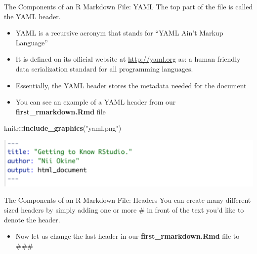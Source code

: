\documentclass[
  ignorenonframetext,
]{beamer}
\newenvironment{Shaded}{\begin{snugshade}}{\end{snugshade}}
\newcommand{\FunctionTok}[1]{\textcolor[rgb]{0.13,0.29,0.53}{\textbf{#1}}}
\newcommand{\NormalTok}[1]{#1}
\newcommand{\SpecialCharTok}[1]{\textcolor[rgb]{0.81,0.36,0.00}{\textbf{#1}}}
\newcommand{\StringTok}[1]{\textcolor[rgb]{0.31,0.60,0.02}{#1}}
\providecommand{\tightlist}{%
  \setlength{\itemsep}{0pt}\setlength{\parskip}{0pt}}
\begin{document}
\begin{frame}[fragile]{The Components of an R Markdown File: YAML}
\protect\hypertarget{the-components-of-an-r-markdown-file-yaml}{}
The top part of the file is called the YAML header.

\begin{itemize}
\item
  YAML is a recursive acronym that stands for ``YAML Ain't Markup
  Language''
\item
  It is defined on its official website at \url{http://yaml.org} as: a
  human friendly data serialization standard for all programming
  languages.
\item
  Essentially, the YAML header stores the metadata needed for the
  document
\item
  You can see an example of a YAML header from our
  \textbf{first\_rmarkdown.Rmd} file
\end{itemize}

\begin{Shaded}
\begin{Highlighting}[]
\NormalTok{knitr}\SpecialCharTok{::}\FunctionTok{include\_graphics}\NormalTok{(}\StringTok{"yaml.png"}\NormalTok{)}
\end{Highlighting}
\end{Shaded}

\begin{center}\includegraphics[width=0.8\linewidth,height=0.2\textheight]{yaml} \end{center}
\end{frame}

\begin{frame}{The Components of an R Markdown File: Headers}
\protect\hypertarget{the-components-of-an-r-markdown-file-headers}{}
You can create many different sized headers by simply adding one or more
\# in front of the text you'd like to denote the header.





\begin{itemize}
\tightlist
\item
  Now let us change the last header in our \textbf{first\_rmarkdown.Rmd}
  file to \#\#\#
\end{itemize}
\end{frame}
\end{document}
